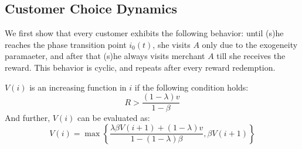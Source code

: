 \subsection{Customer Choice Dynamics}
We first show that every customer exhibits the following behavior: until (s)he reaches the phase transition point $i_0(t)$, she visits $A$ only due to the exogeneity paramaeter, and after that (s)he always visits merchant $A$ till she receives the reward.
This behavior is cyclic, and repeats after every reward redemption.

\begin{lemma} $V(i)$ is an increasing function in $i$ if the following condition holds:
\begin{equation}
R > \frac{(1-\lambda)v}{1-\beta}
\end{equation}
And further, $V(i)$ can be evaluated as:
\begin{equation}
V(i) = \max\left\{ \frac{\lambda \beta V(i+1)+(1-\lambda)v}{1-(1-\lambda)\beta}, \beta V(i+1) \right\}
\end{equation}
\end{lemma}

